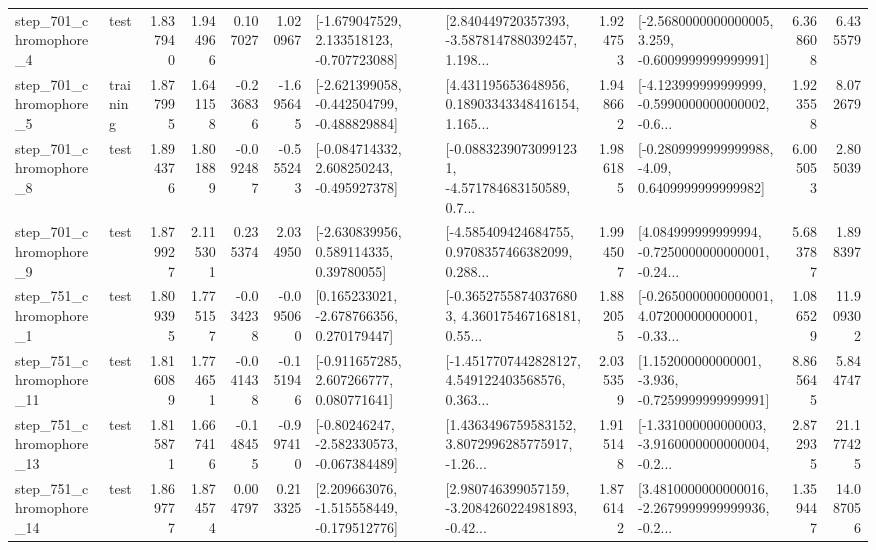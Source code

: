 \begin{tabular}{llrrrrllrlrr}
   step\_701\_chromophore\_4 &      test &      1.837940 &    1.944966 &      0.107027 &  1.020967 &   [-1.679047529, 2.133518123, -0.707723088] &  [2.840449720357393, -3.5878147880392457, 1.198... &       1.924753 &  [-2.5680000000000005, 3.259, -0.6009999999999991] &            6.368608 &          6.435579 \\
   step\_701\_chromophore\_5 &  training &      1.877995 &    1.641158 &     -0.236836 & -1.695645 &  [-2.621399058, -0.442504799, -0.488829884] &  [4.431195653648956, 0.18903343348416154, 1.165... &       1.948662 &  [-4.123999999999999, -0.5990000000000002, -0.6... &            1.923558 &          8.072679 \\
   step\_701\_chromophore\_8 &      test &      1.894376 &    1.801889 &     -0.092487 & -0.555243 &   [-0.084714332, 2.608250243, -0.495927378] &  [-0.08832390730991231, -4.571784683150589, 0.7... &       1.986185 &   [-0.2809999999999988, -4.09, 0.6409999999999982] &            6.005053 &          2.805039 \\
   step\_701\_chromophore\_9 &      test &      1.879927 &    2.115301 &      0.235374 &  2.034950 &     [-2.630839956, 0.589114335, 0.39780055] &  [-4.585409424684755, 0.9708357466382099, 0.288... &       1.994507 &  [4.084999999999994, -0.7250000000000001, -0.24... &            5.683787 &          1.898397 \\
   step\_751\_chromophore\_1 &      test &      1.809395 &    1.775157 &     -0.034238 & -0.095060 &    [0.165233021, -2.678766356, 0.270179447] &  [-0.36527558740376803, 4.360175467168181, 0.55... &       1.882055 &  [-0.2650000000000001, 4.072000000000001, -0.33... &            1.086529 &         11.909302 \\
  step\_751\_chromophore\_11 &      test &      1.816089 &    1.774651 &     -0.041438 & -0.151946 &    [-0.911657285, 2.607266777, 0.080771641] &  [-1.4517707442828127, 4.549122403568576, 0.363... &       2.035359 &   [1.152000000000001, -3.936, -0.7259999999999991] &            8.865645 &          5.844747 \\
  step\_751\_chromophore\_13 &      test &      1.815871 &    1.667416 &     -0.148455 & -0.997410 &   [-0.80246247, -2.582330573, -0.067384489] &  [1.4363496759583152, 3.8072996285775917, -1.26... &       1.915148 &  [-1.331000000000003, -3.9160000000000004, -0.2... &            2.872935 &         21.177425 \\
  step\_751\_chromophore\_14 &      test &      1.869777 &    1.874574 &      0.004797 &  0.213325 &   [2.209663076, -1.515558449, -0.179512776] &  [2.980746399057159, -3.2084260224981893, -0.42... &       1.876142 &  [3.4810000000000016, -2.2679999999999936, -0.2... &            1.359447 &         14.087056 \\

\end{tabular}
